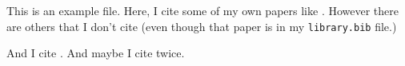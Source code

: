\documentclass[11pt,english]{article}
\begin{document}
This is an example file. Here, I cite some of my own papers like \citet{Feigenbaum2016}. However there are others that I don't cite (even though that paper is in my \texttt{library.bib} file.)

And I cite \citet{Feigenbaum2015a}. And maybe I cite \citet{Feigenbaum2016, Feigenbaum2015a} twice.



\end{document}
